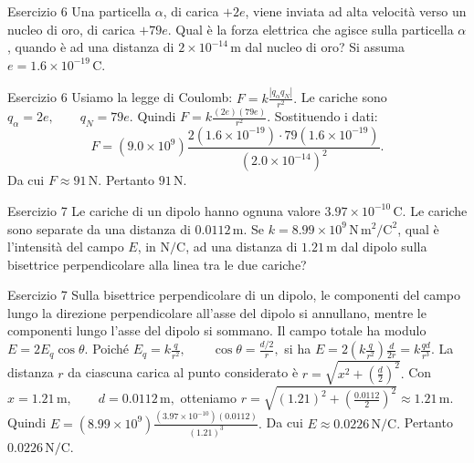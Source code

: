 \documentclass[a4paper]{article}
\begin{document}
\begin{snippetexercise}{Esercizio 6}
    Una particella \(\alpha\), di carica \(+2e\), viene inviata ad alta
    velocità verso un nucleo di oro, di carica \(+79e\). Qual è la forza
    elettrica che agisce sulla particella \(\alpha\), quando è ad una distanza
    di \(2 \times 10^{-14}\,\mathrm{m}\) dal nucleo di oro?
    Si assuma \(e = 1.6 \times 10^{-19}\,\mathrm{C}\).

\end{snippetexercise}
\begin{snippetsolution}{Esercizio 6}
    Usiamo la legge di Coulomb:
    \(F = k\frac{|q_{\alpha}q_N|}{r^2}.\)
    Le cariche sono
    \(q_{\alpha} = 2e, \qquad q_N = 79e.\)
    Quindi
    \(F = k\frac{(2e)(79e)}{r^2}.\)
    Sostituendo i dati:
    \[
        F =
        \left(9.0 \times 10^9\right)
        \frac{
            2(1.6 \times 10^{-19})
            \cdot
            79(1.6 \times 10^{-19})
        }{
            \left(2.0 \times 10^{-14}\right)^2
        }.
    \]
    Da cui
    \(F \approx 91\,\mathrm{N}.\)
    Pertanto
    \(\boxed{91\,\mathrm{N}}.\)
\end{snippetsolution}
\begin{snippetexercise}{Esercizio 7}
    Le cariche di un dipolo hanno ognuna valore
    \(3.97 \times 10^{-10}\,\mathrm{C}\). Le cariche sono separate da una
    distanza di \(0.0112\,\mathrm{m}\). Se
    \(k = 8.99 \times 10^9\,\mathrm{N\,m^2/C^2}\), qual è l'intensità del
    campo \(E\), in \(\mathrm{N/C}\), ad una distanza di \(1.21\,\mathrm{m}\)
    dal dipolo sulla bisettrice perpendicolare alla linea tra le due cariche?

\end{snippetexercise}
\begin{snippetsolution}{Esercizio 7}
    Sulla bisettrice perpendicolare di un dipolo, le componenti del campo
    lungo la direzione perpendicolare all'asse del dipolo si annullano, mentre
    le componenti lungo l'asse del dipolo si sommano.
    Il campo totale ha modulo
    \(E = 2E_q\cos\theta.\)
    Poiché
    \(E_q = k\frac{q}{r^2}, \qquad \cos\theta = \frac{d/2}{r},\)
    si ha
    \(E = 2\left(k\frac{q}{r^2}\right)\frac{d}{2r} = k\frac{qd}{r^3}.\)
    La distanza \(r\) da ciascuna carica al punto considerato è
    \(r = \sqrt{ x^2 + \left(\frac{d}{2}\right)^2 }.\)
    Con
    \(x = 1.21\,\mathrm{m}, \qquad d = 0.0112\,\mathrm{m},\)
    otteniamo
    \(r = \sqrt{ (1.21)^2 + \left(\frac{0.0112}{2}\right)^2 } \approx 1.21\,\mathrm{m}.\)
    Quindi
    \(E = \left(8.99 \times 10^9\right) \frac{ \left(3.97 \times 10^{-10}\right)(0.0112) }{ (1.21)^3 }.\)
    Da cui
    \(E \approx 0.0226\,\mathrm{N/C}.\)
    Pertanto
    \(\boxed{0.0226\,\mathrm{N/C}}.\)
\end{snippetsolution}
\end{document}
